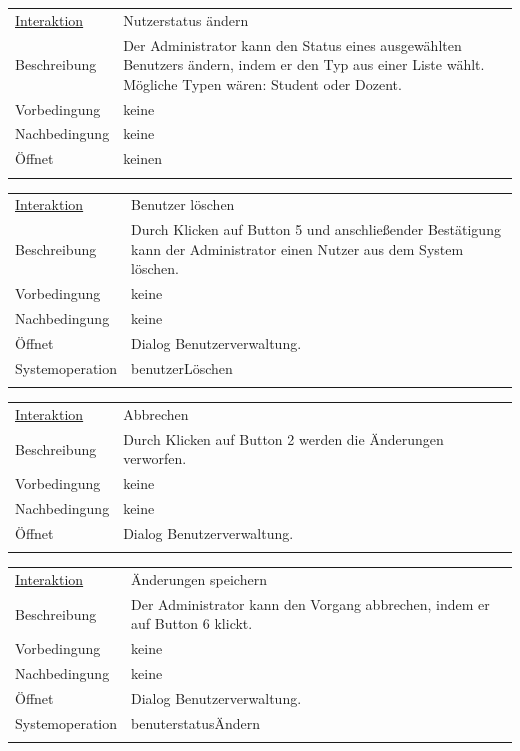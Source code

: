 \documentclass[12pt,a4paper]{article}
\begin{document}
{\begin{tabular}{l p{12cm}}
	\underline{Interaktion} 	 & Nutzerstatus ändern\\ 
	Beschreibung   	& Der Administrator kann den Status eines ausgewählten Benutzers ändern, indem er den Typ aus einer Liste wählt. Mögliche Typen wären: Student oder Dozent.\\
	Vorbedingung	& keine \\
	Nachbedingung	& keine \\
	Öffnet			& keinen\\\\
\end{tabular}

\begin{tabular}{l p{12cm}}
	\underline{Interaktion} 	 & Benutzer löschen\\ 
	Beschreibung   	& Durch Klicken auf Button 5 und anschließender Bestätigung kann der Administrator einen Nutzer aus dem System löschen.\\
	Vorbedingung	& keine \\
	Nachbedingung	& keine \\
	Öffnet			& Dialog \glqq Benutzerverwaltung\grqq.\\
	Systemoperation & benutzerLöschen\\\\
\end{tabular}

\begin{tabular}{l p{12cm}}
	\underline{Interaktion} 	 & Abbrechen\\ 
	Beschreibung   	& Durch Klicken auf Button 2 werden die Änderungen verworfen.\\
	Vorbedingung	& keine \\
	Nachbedingung	& keine \\
	Öffnet			& Dialog \glqq Benutzerverwaltung\grqq.\\\\
\end{tabular}

\begin{tabular}{l p{12cm}}
	\underline{Interaktion} 	 & Änderungen speichern\\ 
	Beschreibung   	& Der Administrator kann den Vorgang abbrechen, indem er auf Button 6 klickt.\\
	Vorbedingung	& keine \\
	Nachbedingung	& keine \\
	Öffnet			& Dialog \glqq Benutzerverwaltung\grqq.\\
	Systemoperation & benuterstatusÄndern\\\\
\end{tabular}

}
\end{document}
